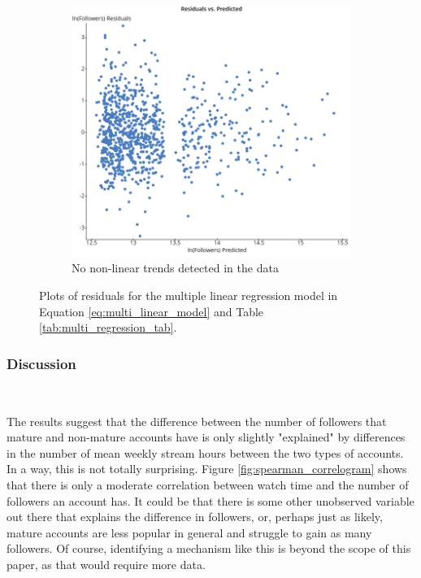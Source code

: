 \documentclass[12pt]{article}
\begin{document}
\begin{figure}
\begin{subfigure}{0.45\textwidth}
        \includegraphics[width=\textwidth]{../StatCrunch_Results/followers_mature_watch_hrs/residual_plot}
        \caption{No non-linear trends detected in the data}
        \label{fig:plot2}
    \end{subfigure}
    \caption[Residual Plot for ML Regression]{Plots of residuals for the multiple linear regression model in Equation \ref{eq:multi_linear_model} and Table \ref{tab:multi_regression_tab}.}
    \label{fig:both_plots}
\end{figure}

\subsubsection{Discussion}\

The results suggest that the difference between the number of followers that mature and non-mature accounts have is only slightly "explained" by differences in the number of mean weekly stream hours between the two types of accounts. In a way, this is not totally surprising. Figure \ref{fig:spearman_correlogram} shows that there is only a moderate correlation between watch time and the number of followers an account has. It could be that there is some other unobserved variable out there that explains the difference in followers, or, perhaps just as likely, mature accounts are less popular in general and struggle to gain as many followers. Of course, identifying a mechanism like this is beyond the scope of this paper, as that would require more data.
\end{document}
